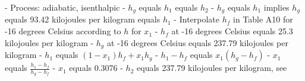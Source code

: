 - Process: adiabatic, isenthalpic
- \( h_{g} \) equals \( h_{1} \) equals \( h_{2} \)
- \( h_{g} \) equals \( h_{1} \) implies \( h_{g} \) equals 93.42 kilojoules per kilogram equals \( h_{1} \)
- Interpolate \( h_{f} \) in Table A10 for -16 degrees Celsius according to \( h \) for \( x_{1} \)
- \( h_{f} \) at -16 degrees Celsius equals 25.3 kilojoules per kilogram
- \( h_{g} \) at -16 degrees Celsius equals 237.79 kilojoules per kilogram
- \( h_{1} \) equals \( (1 - x_{1}) h_{f} + x_{1} h_{g} \)
- \( h_{1} - h_{f} \) equals \( x_{1} (h_{g} - h_{f}) \)
- \( x_{1} \) equals \( \frac{h_{1} - h_{f}}{h_{g} - h_{f}} \)
- \( x_{1} \) equals 0.3076
- \( h_{2} \) equals 237.79 kilojoules per kilogram, see